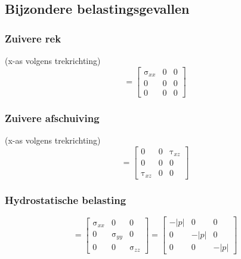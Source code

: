         \subsection{Bijzondere belastingsgevallen}

            \subsubsection{Zuivere rek}

                (x-as volgens trekrichting)
                \begin{equation}
                    [\upsigma] = \left[\begin{matrix}
                        \upsigma_{xx} & 0 & 0 \\
                        0 & 0 & 0 \\
                        0 & 0 & 0
                    \end{matrix}\right]
                \end{equation}
            
            \subsubsection{Zuivere afschuiving}
                
                (x-as volgens trekrichting)
                \begin{equation}
                    [\upsigma] = \left[\begin{matrix}
                        0 & 0 & \uptau_{xz} \\
                        0 & 0 & 0 \\
                        \uptau_{xz} & 0 & 0
                    \end{matrix}\right]
                \end{equation}
            
            \subsubsection{Hydrostatische belasting}

                \begin{equation}
                    [\upsigma] = \left[\begin{matrix}
                        \upsigma_{xx} & 0 & 0 \\
                        0 & \upsigma_{yy} & 0 \\
                        0 & 0 & \upsigma_{zz}
                    \end{matrix}\right] = \left[\begin{matrix}
                        -|p| & 0 & 0 \\
                        0 & -|p| & 0 \\
                        0 & 0 & -|p|
                    \end{matrix}\right]
                \end{equation}
                
